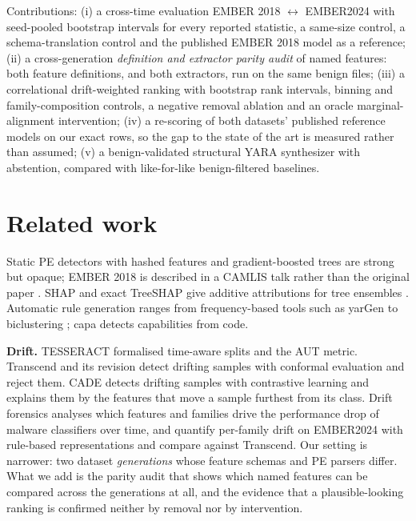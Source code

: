 \documentclass[10pt]{article}
\begin{document}
Contributions: (i) a cross-time evaluation EMBER 2018 $\leftrightarrow$ EMBER2024 with seed-pooled
bootstrap intervals for every reported statistic, a same-size control, a schema-translation control
and the published EMBER 2018 model as a reference; (ii) a cross-generation \emph{definition and
extractor parity audit} of named features: both feature definitions, and both extractors, run on the
same benign files; (iii) a correlational drift-weighted ranking with bootstrap rank intervals,
binning and family-composition controls, a negative removal ablation and an oracle marginal-alignment
intervention; (iv) a re-scoring of both datasets' published reference models on our exact rows, so
the gap to the state of the art is measured rather than assumed; (v) a benign-validated structural
YARA synthesizer with abstention, compared with like-for-like benign-filtered baselines.

\section{Related work}
Static PE detectors with hashed features and gradient-boosted trees
\citep{anderson2018ember,ke2017lightgbm,emberrepo} are strong but opaque; EMBER 2018 is described in a
CAMLIS talk rather than the original paper \citep{roth2019camlis}. SHAP \citep{lundberg2017shap} and exact
TreeSHAP \citep{lundberg2020tree} give additive attributions for tree ensembles \citep{chen2016xgboost}.
Automatic rule generation ranges from frequency-based tools such as yarGen \citep{yargen} to
biclustering \citep{raff2020autoyara}; capa \citep{capa} detects capabilities from code.

\textbf{Drift.} TESSERACT \citep{pendlebury2019tesseract} formalised time-aware splits and the AUT
metric. Transcend \citep{jordaney2017transcend} and its revision \citep{barbero2022transcending} detect
drifting samples with conformal evaluation and reject them. CADE \citep{yang2021cade} detects drifting
samples with contrastive learning and explains them by the features that move a sample furthest from its
class. Drift forensics \citep{chow2023drift} analyses which features and families drive the
performance drop of malware classifiers over time, and \citet{kalny2026drift} quantify per-family
drift on EMBER2024 with rule-based representations and compare against Transcend. Our setting is
narrower: two dataset \emph{generations} whose feature schemas and PE parsers differ. What we add is the
parity audit that shows which named features can be compared across the generations at all, and the
evidence that a plausible-looking ranking is confirmed neither by removal nor by intervention.
\end{document}
